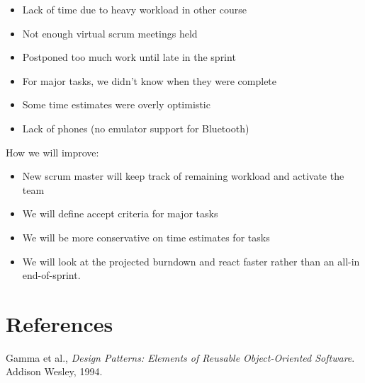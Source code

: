 \documentclass[a4paper,11pt]{article}
\begin{document}
\begin{itemize}
	\item Lack of time due to heavy workload in other course
	\item Not enough virtual scrum meetings held
	\item Postponed too much work until late in the sprint
	\item For major tasks, we didn’t know when they were complete
	\item Some time estimates were overly optimistic
	\item Lack of phones (no emulator support for Bluetooth)
\end{itemize}

\noindent
How we will improve:
\begin{itemize}
	\item New scrum master will keep track of remaining workload and activate the team
	\item We will define accept criteria for major tasks
	\item We will be more conservative on time estimates for tasks
	\item We will look at the projected burndown and react faster rather than an all-in end-of-sprint.
\end{itemize}

\section{References}
\begin{thebibliography}{9}
\vspace{-3em}

  Gamma et al.,
  \emph{Design Patterns: Elements of Reusable Object-Oriented Software}.
  Addison Wesley, 1994.

\end{thebibliography}
\end{document}
